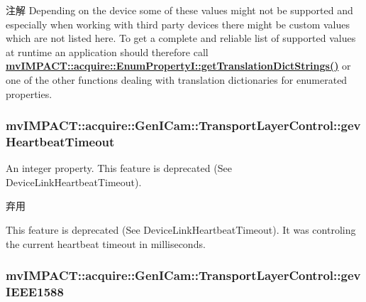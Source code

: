 \begin{DoxyNote}{注解}
Depending on the device some of these values might not be supported and especially when working with third party devices there might be custom values which are not listed here. To get a complete and reliable list of supported values at runtime an application should therefore call {\bfseries \hyperlink{classmv_i_m_p_a_c_t_1_1acquire_1_1_enum_property_i_a0ba6ccbf5ee69784d5d0b537924d26b6}{mv\+I\+M\+P\+A\+C\+T\+::acquire\+::\+Enum\+Property\+I\+::get\+Translation\+Dict\+Strings()}} or one of the other functions dealing with translation dictionaries for enumerated properties. 
\end{DoxyNote}
\hypertarget{classmv_i_m_p_a_c_t_1_1acquire_1_1_gen_i_cam_1_1_transport_layer_control_a4c02bd7723507996e0833eba3a0a2282}{
\subsubsection[{gev\+Heartbeat\+Timeout}]{ mv\+I\+M\+P\+A\+C\+T\+::acquire\+::\+Gen\+I\+Cam\+::\+Transport\+Layer\+Control\+::gev\+Heartbeat\+Timeout}}\label{classmv_i_m_p_a_c_t_1_1acquire_1_1_gen_i_cam_1_1_transport_layer_control_a4c02bd7723507996e0833eba3a0a2282}


An integer property. This feature is deprecated (See Device\+Link\+Heartbeat\+Timeout). 

\begin{DoxyRefDesc}{弃用}
\item[\hyperlink{deprecated__deprecated000077}{弃用}]This feature is deprecated (See Device\+Link\+Heartbeat\+Timeout). It was controling the current heartbeat timeout in milliseconds. \end{DoxyRefDesc}
\hypertarget{classmv_i_m_p_a_c_t_1_1acquire_1_1_gen_i_cam_1_1_transport_layer_control_a878c1e0692e2aa71b67be94bcb071c64}{
\subsubsection[{gev\+I\+E\+E\+E1588}]{ mv\+I\+M\+P\+A\+C\+T\+::acquire\+::\+Gen\+I\+Cam\+::\+Transport\+Layer\+Control\+::gev\+I\+E\+E\+E1588}}\label{classmv_i_m_p_a_c_t_1_1acquire_1_1_gen_i_cam_1_1_transport_layer_control_a878c1e0692e2aa71b67be94bcb071c64}



